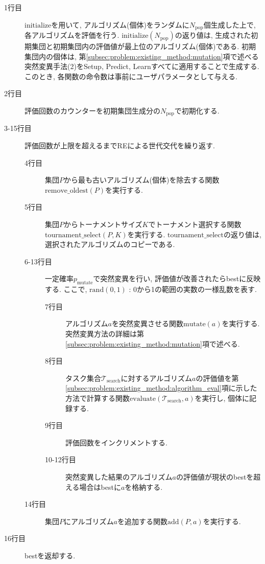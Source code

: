 \documentclass[11pt,oneside,openany,report]{jsbook}
\begin{document}
\begin{description}
  \item[1行目] $\mathrm{initialize}$を用いて, アルゴリズム(個体)をランダムに$N_\mathrm{pop}$個生成した上で, 各アルゴリズムを評価を行う.  $\mathrm{initialize}(N_\mathrm{pop})$の返り値は, 生成された初期集団と初期集団内の評価値が最上位のアルゴリズム(個体)である. 初期集団内の個体は, 第\ref{subsec:problem:existing_method:mutation}項で述べる突然変異手法(2)をSetup, Predict, Learnすべてに適用することで生成する. このとき, 各関数の命令数は事前にユーザパラメータとして与える.
  \item[2行目] 評価回数のカウンターを初期集団生成分の$N_\mathrm{pop}$で初期化する.
  \item[3-15行目] 評価回数が上限を超えるまでREによる世代交代を繰り返す.
    \begin{description}
      \item[4行目] 集団$P$から最も古いアルゴリズム(個体)を除去する関数$\mathrm{remove\_oldest}(P)$を実行する.
      \item[5行目] 集団$P$からトーナメントサイズ$K$でトーナメント選択する関数$\mathrm{tournament\_select}(P, K)$を実行する. $\mathrm{tournament\_select}$の返り値は, 選択されたアルゴリズムのコピーである.
      \item[6-13行目] 一定確率$p_\mathrm{mutate}$で突然変異を行い, 評価値が改善されたらbestに反映する. ここで, $\mathrm{rand}(0, 1)$ : 0から1の範囲の実数の一様乱数を表す.
        \begin{description}
          \item[7行目] アルゴリズム$a$を突然変異させる関数$\mathrm{mutate}(a)$を実行する. 突然変異方法の詳細は第\ref{subsec:problem:existing_method:mutation}項で述べる.
          \item[8行目] タスク集合$\mathcal{T_\mathrm{search}}$に対するアルゴリズム$a$の評価値を第\ref{subsec:problem:existing_method:algorithm_eval}項に示した方法で計算する関数$\mathrm{evaluate}(\mathcal{T_\mathrm{search}}, a)$を実行し, 個体に記録する.
          \item[9行目] 評価回数をインクリメントする.
          \item[10-12行目] 突然変異した結果のアルゴリズム$a$の評価値が現状のbestを超える場合はbestに$a$を格納する.
        \end{description}
      \item[14行目] 集団$P$にアルゴリズム$a$を追加する関数$\mathrm{add}(P, a)$を実行する.
    \end{description}
  \item[16行目] bestを返却する.
\end{description}
\end{document}
